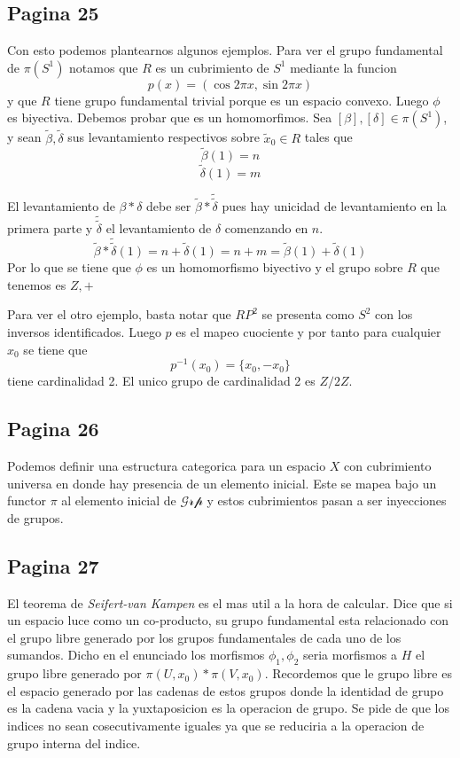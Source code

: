 \documentclass[letterpaper]{article}
\newcommand{\vank}{\emph{Seifert-van Kampen} }
\begin{document}
\subsection*{Pagina 25}
Con esto podemos plantearnos algunos ejemplos. Para ver el grupo
fundamental de \(\pi(S^1)\) notamos que \(R\) es un cubrimiento de \(S^1
\) mediante la funcion
\[ p (x) = (\cos 2 \pi x, \sin 2 \pi x) \]
y que \(R\) tiene grupo fundamental trivial porque es un espacio
convexo. Luego \(\phi\) es biyectiva. Debemos probar que es un
homomorfimos.
Sea \([\beta],[\delta] \in \pi (S^1)\), y sean \(\tilde
\beta , \tilde \delta\) sus levantamiento respectivos sobre \(\tilde x_0
\in R\) tales que
\[ \tilde \beta (1) = n \]
\[ \tilde \delta (1) = m \]

El levantamiento de \(\beta * \delta \) debe ser \(\tilde \beta
* \tilde {\tilde \delta}\) pues hay unicidad de levantamiento en la
primera parte y \(\tilde {\tilde \delta}\) el levantamiento de
\(\delta\) comenzando en \(n\).
\[ \tilde \beta * \tilde {\tilde \delta} (1) = n + \tilde \delta (1) =
  n + m = \tilde \beta (1) + \tilde \delta (1) \]
Por lo que se tiene que \(\phi \) es un homomorfismo biyectivo y el
grupo sobre \(R\) que tenemos es \(Z, +\)

Para ver el otro ejemplo, basta notar que \(RP^2\) se presenta como
\(S^2 \) con los inversos identificados. Luego \(p\) es el mapeo cuociente
y por tanto para cualquier \(x_0\) se tiene que
\[ p^{-1} (x_0) = \{x_0 , - x_0\}\]
tiene cardinalidad 2. El unico grupo de cardinalidad 2 es \(Z/2Z\).

\subsection*{Pagina 26}
Podemos definir una estructura categorica para un espacio \(X\) con
cubrimiento universa en donde hay presencia de un elemento inicial. Este
se mapea bajo un functor \(\pi\) al elemento inicial de
\(\mathscr{Grp}\) y estos cubrimientos pasan a ser inyecciones de grupos.

\subsection*{Pagina 27}
El teorema de \vank es el mas util a la hora de calcular. Dice que si un
espacio luce como un co-producto, su grupo fundamental esta relacionado
con el grupo libre generado por los grupos fundamentales de cada uno de
los sumandos. Dicho en el enunciado los morfismos \(\phi_1, \phi_2\)
seria morfismos a \(H\) el grupo libre generado por \(\pi (U,x_0) * \pi
(V,x_0)\). Recordemos que le grupo libre es el espacio generado por las
cadenas de estos grupos donde la identidad de grupo es la cadena vacia y
la yuxtaposicion es la operacion de grupo. Se pide de que los indices no
sean cosecutivamente iguales ya que se reduciria a la operacion de grupo
interna del indice.
\end{document}
